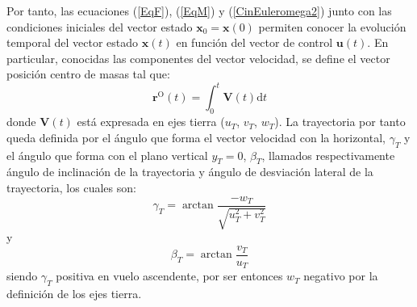 Por tanto, las ecuaciones (\ref{EqF}), (\ref{EqM}) y (\ref{CinEuleromega2}) junto con las condiciones iniciales del vector estado $\mathrm{\textbf{x}_0}=\mathrm{\textbf{x}(0)}$ permiten conocer la evolución temporal del vector estado $\mathrm{\textbf{x}}(t)$ en función del vector de control $\mathrm{\textbf{u}}(t)$. En particular, conocidas las componentes del vector velocidad, se define el vector posición centro de masas tal que: 
\begin{equation}
	\mathrm{\textbf{r}^O}(t)=\int_{0}^{t}\mathrm{\textbf{V}}(t)\mathrm{d}t
\end{equation}
donde $\mathrm{\textbf{V}}(t)$ está expresada en ejes tierra ($u_T$, $v_T$, $w_T$). La trayectoria por tanto queda definida por el ángulo que forma el vector velocidad con la horizontal, $\gamma_T$ y el ángulo que forma con el plano vertical $y_T=0$, $\beta_T$, llamados respectivamente ángulo de inclinación de la trayectoria y ángulo de desviación lateral de la trayectoria, los cuales son:
\begin{equation}
	\gamma_T=\arctan\frac{-w_T}{\sqrt{u_T^2+v_T^2}}
	\label{gammat}
\end{equation}
y
\begin{equation}
\beta_T=\arctan\frac{v_T}{u_T}
\label{betat}
\end{equation}
siendo $\gamma_T$ positiva en vuelo ascendente, por ser entonces $w_T$ negativo por la definición de los ejes tierra.

